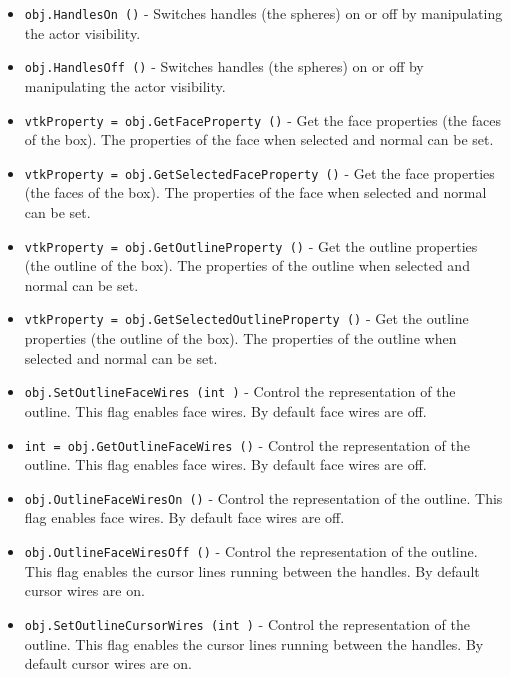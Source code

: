 \begin{itemize}
\item  \verb|obj.HandlesOn ()| -  Switches handles (the spheres) on or off by manipulating the actor
 visibility.

\item  \verb|obj.HandlesOff ()| -  Switches handles (the spheres) on or off by manipulating the actor
 visibility.

\item  \verb|vtkProperty = obj.GetFaceProperty ()| -  Get the face properties (the faces of the box). The 
 properties of the face when selected and normal can be 
 set.

\item  \verb|vtkProperty = obj.GetSelectedFaceProperty ()| -  Get the face properties (the faces of the box). The 
 properties of the face when selected and normal can be 
 set.

\item  \verb|vtkProperty = obj.GetOutlineProperty ()| -  Get the outline properties (the outline of the box). The 
 properties of the outline when selected and normal can be 
 set.

\item  \verb|vtkProperty = obj.GetSelectedOutlineProperty ()| -  Get the outline properties (the outline of the box). The 
 properties of the outline when selected and normal can be 
 set.

\item  \verb|obj.SetOutlineFaceWires (int )| -  Control the representation of the outline. This flag enables
 face wires. By default face wires are off.

\item  \verb|int = obj.GetOutlineFaceWires ()| -  Control the representation of the outline. This flag enables
 face wires. By default face wires are off.

\item  \verb|obj.OutlineFaceWiresOn ()| -  Control the representation of the outline. This flag enables
 face wires. By default face wires are off.

\item  \verb|obj.OutlineFaceWiresOff ()| -  Control the representation of the outline. This flag enables
 the cursor lines running between the handles. By default cursor
 wires are on.

\item  \verb|obj.SetOutlineCursorWires (int )| -  Control the representation of the outline. This flag enables
 the cursor lines running between the handles. By default cursor
 wires are on.


\end{itemize}

